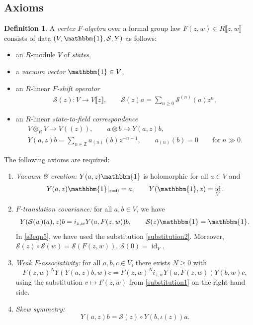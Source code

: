 \documentclass[pdftex]{sigma}
\numberwithin{equation}{section}
\theoremstyle{definition}
\newtheorem{Definition}[Theorem]{Definition}
\DeclareMathOperator\id{id}
\def\lb{\llbracket}
\def\rb{\rrbracket}
\begin{document}
\subsection{Axioms}
\label{s41}

\begin{Definition}
\label{s3dfn1}
A \emph{vertex $F$-algebra} over a formal group law $F(z,w)\in R\lb z,w\rb$ consists of data $(V,\mathbbm{1},\mathcal{S},Y)$ as follows:
\begin{itemize}\itemsep=0pt
\item
an $R$-module $V$ of \emph{states},
\item
a \emph{vacuum vector} $\mathbbm{1}\in V$,
\item
an $R$-linear \emph{$F$-shift operator}
\begin{align}
\label{F-shift}
\mathcal{S}(z)\colon V \longrightarrow V\lb z\rb,\qquad
\mathcal{S}(z)a=\sum_{n\geqslant0} \mathcal{S}^{(n)}(a)z^n,
\end{align}
\item
an $R$-linear \emph{state-to-field correspondence}
\begin{gather}%
 V\otimes_R V \longrightarrow V(\!( z)\!),\qquad a\otimes b\longmapsto Y(a,z)b,\nonumber\\
 \label{s3eqn10}
 Y(a,z)b = \sum_{n\in\mathbb{Z}} a_{(n)}(b)z^{-n-1},\qquad a_{(n)}(b)=0\qquad \text{for} \ n\gg 0.
\end{gather}
\end{itemize}
The following axioms are required:
\begin{enumerate}\itemsep=0pt
	\item[$(1)$] \emph{Vacuum \& creation:} $Y(a,z)\mathbbm{1}$ is holomorphic for all $a\in V$ and
	\begin{align}%
	 Y(a,z)\mathbbm{1} |_{z=0} = a,\qquad
 Y(\mathbbm{1},z) = \id_V.\label{s3eqn4}
	\end{align}
	\item[$(2)$] {\it $F$-translation covariance:} for all $a, b \in V$, we have
	\begin{align}%
	 Y(\mathcal{S}(w)(a),z)b = i_{z,w} Y(a, F(z,w))b,\qquad
	 \mathcal{S}(z)\mathbbm{1} = \mathbbm{1}.\label{s3eqn5}
	\end{align}
	In \eqref{s3eqn5}, we have used the substitution \eqref{substitution2}. Moreover,
	$\mathcal{S}(z)\circ\mathcal{S}(w) =\mathcal{S}(F(z,w))$,
	$\mathcal{S}(0)=\id_V$.
	\item[$(3)$] \emph{Weak $F$-associativity:} for all $a,b,c \in V$, there exists $N \geqslant 0$ with
 \begin{equation}
 \label{s3eqn7}
 F(z,w)^N Y(Y(a,z)b,w)c = F(z,w)^N i_{z,w} Y(a, F(z,w)) Y(b,w) c,
 \end{equation}
 using the substitution $v\mapsto F(z,w)$ from \eqref{substitution1} on the right-hand side.
 \item[$(4)$] \emph{Skew symmetry:}
 \begin{equation}
 \label{s3eqn8}
 Y(a,z)b =\mathcal{S}(z) \circ Y(b, \iota(z))a.
 \end{equation}
\end{enumerate}
\end{Definition}
\end{document}
